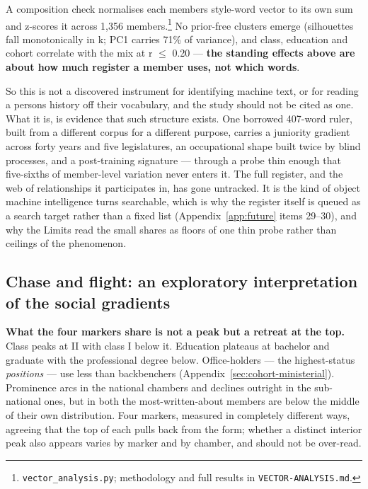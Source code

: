 A composition check normalises each member\textquotesingle s style-word vector to its own sum
and z-scores it across 1,356 members.\footnote{\texttt{vector\_analysis.py}; methodology and full results in
  \texttt{VECTOR-ANALYSIS.md}.} No prior-free clusters emerge
(silhouettes fall monotonically in k; PC1 carries 71\% of variance), and class,
education and cohort correlate with the mix at \textbar r\textbar{} \(\leq\) 0.20 --- \textbf{the standing
effects above are about how much register a member uses, not which words}.

So this is not a discovered instrument for identifying machine text, or for reading a person\textquotesingle s history off their vocabulary, and the study should not be cited as one. What it is, is evidence that such structure exists. One borrowed 407-word ruler, built from a different corpus for a different purpose, carries a juniority gradient across forty years and five legislatures, an occupational shape built twice by blind processes, and a post-training signature --- through a probe thin enough that five-sixths of member-level variation never enters it. The full register, and the web of relationships it participates in, has gone untracked. It is the kind of object machine intelligence turns searchable, which is why the register itself is queued as a search target rather than a fixed list (Appendix~\ref{app:future} items 29--30), and why the Limits read the small shares as floors of one thin probe rather than ceilings of the phenomenon.

\subsection{Chase and flight: an exploratory interpretation of the social gradients}\label{sec:chase-flight}

\textbf{What the four markers share is not a peak but a retreat at the top.} Class
peaks at II with class I below it. Education plateaus at bachelor and graduate
with the professional degree below. Office-holders --- the highest-status
\emph{positions} --- use less than backbenchers (Appendix~\ref{sec:cohort-ministerial}). Prominence arcs in the
national chambers and declines outright in the sub-national ones, but in both
the most-written-about members are below the middle of their own distribution.
Four markers, measured in completely different ways, agreeing that the top of
each pulls back from the form; whether a distinct interior peak also appears
varies by marker and by chamber, and should not be over-read.

